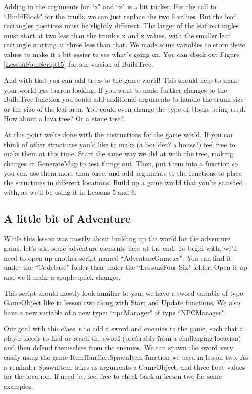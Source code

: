 \documentclass{article}
\begin{document}
Adding in the arguments for ``x" and ``z" is a bit tricker. For the call to ``BuildBlock" for the trunk, we can just replace the two 5 values. But the leaf rectangles positions must be slightly different. The larger of the leaf rectangles must start at two less than the trunk's x and z values, with the smaller leaf rectangle starting at three less than that. We made some variables to store these values to make it a bit easier to see what's going on. You can check out Figure \ref{LessonFourScript15} for our version of BuildTree. 

And with that you can add trees to the game world! This should help to make your world less barren looking. If you want to make further changes to the BuildTree function you could add additional arguments to handle the trunk size or the size of the leaf area. You could even change the type of blocks being used. How about a lava tree? Or a stone tree?

At this point we're done with the instructions for the game world. If you can think of other structures you'd like to make (a boulder? a house?) feel free to make them at this time. Start the same way we did at with the tree, making changes in GenerateMap to test things out. Then, put them into a function so you can use them more than once, and add arguments to the functions to place the structures in different locations! Build up a game world that you're satisfied with, as we'll be using it in Lessons 5 and 6.

\subsection{A little bit of Adventure}

While this lesson was mostly about building up the world for the adventure game, let's add some adventure elements here at the end. To begin with, we'll need to open up another script named ``AdventureGame.cs". You can find it under the ``Codebase" folder then under the ``LessonsFour-Six" folder. Open it up and we'll make a couple quick changes. 

This script should mostly look familiar to you, we have a sword variable of type GameObject like in lesson two along with Start and Update functions. We also have a new variable of a new type: ``npcManager" of type ``NPCManager". 

Our goal with this class is to add a sword and enemies to the game, such that a player needs to find or reach the sword (preferably from a challenging location) and then defend themselves from the enemies. We can spawn the sword very easily using the game ItemHandler.SpawnItem function we used in lesson two. As a reminder SpawnItem takes as arguments a GameObject, and three float values for the location. If need be, feel free to check back in lesson two for some examples. 
\end{document}

